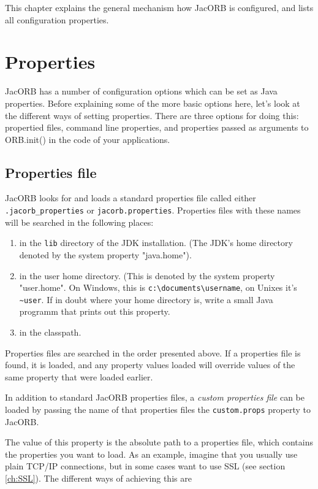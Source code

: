 This chapter explains the general mechanism how JacORB is configured,
and lists all configuration properties.

\section{Properties}

JacORB has a number of configuration options which can be set as Java
properties.  Before explaining some of the more basic options here,
let's look at the different ways of setting properties. There are
three options for doing this: propertied files, command line
properties, and properties passed as arguments to ORB.init() in the
code of your applications.

\subsection{Properties file}

JacORB looks for and loads a standard properties file called either
{\tt .jacorb\_properties} or {\tt jacorb.properties}. Properties files
with these names will be searched in the following places:

\begin{enumerate}
\item in the {\tt lib} directory of the JDK installation. (The JDK's
  home directory denoted by the system property "java.home").
\item in the user home directory. (This is denoted by the system
    property "user.home". On Windows, this is
    {\verb+c:\documents\username+}, on Unixes it's {\verb+~user+}. If
    in doubt where your home directory is, write a small Java programm that
  prints out this property.
\item in the classpath.
\end{enumerate}

Properties files are searched in the order presented above. If a
properties file is found, it is loaded, and any property values loaded
will override values of the same property that were loaded earlier.

In addition to standard JacORB properties files, a {\em custom
  properties file} can be loaded by passing the name of that
properties files the {\tt custom.props} property to JacORB.

The value of this property is the absolute path to a properties file,
which contains the properties you want to load. As an example, imagine that you
usually use plain TCP/IP connections, but in some cases want to use
SSL (see section \ref{ch:SSL}). The different ways of achieving this are

